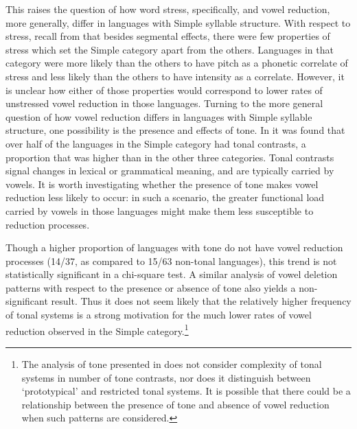   This raises the question of how word stress, specifically, and vowel reduction, more generally, differ in languages with Simple syllable structure. With respect to stress, recall from  that besides segmental effects, there were few properties of stress which set the Simple category apart from the others. Languages in that category were more likely than the others to have pitch as a phonetic correlate of stress and less likely than the others to have intensity as a correlate. However, it is unclear how either of those properties would correspond to lower rates of unstressed vowel reduction in those languages. Turning to the more general question of how vowel reduction differs in languages with Simple syllable structure, one possibility is the presence and effects of tone. In  it was found that over half of the languages in the Simple category had tonal contrasts, a proportion that was higher than in the other three categories. Tonal contrasts signal changes in lexical or grammatical meaning, and are typically carried by vowels. It is worth investigating whether the presence of tone makes vowel reduction less likely to occur: in such a scenario, the greater functional load carried by vowels in those languages might make them less susceptible to reduction processes.

  Though a higher proportion of languages with tone do not have vowel reduction processes (14/37, as compared to 15/63 non-tonal languages), this trend is not statistically significant in a chi-square test. A similar analysis of vowel deletion patterns with respect to the presence or absence of tone also yields a non-significant result. Thus it does not seem likely that the relatively higher frequency of tonal systems is a strong motivation for the much lower rates of vowel reduction observed in the Simple category.\footnote{ \textrm{The analysis of tone presented in  does not consider complexity of tonal systems in number of tone contrasts,  nor does it distinguish between ‘prototypical’ and restricted tonal systems. It is possible that there could be a relationship between the presence of tone and absence of vowel reduction when such patterns are considered.}}

